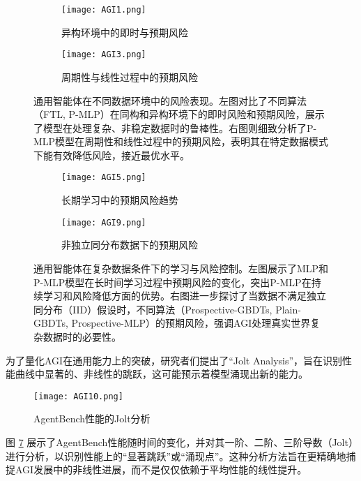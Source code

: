\begin{figure}[H]
    \centering
    \begin{subfigure}[b]{0.49\textwidth}
        \centering
        \texttt{[image: AGI1.png]}
        \caption{异构环境中的即时与预期风险}
        \label{fig:agi_heterogeneous_risk}
    \end{subfigure}
    \hfill
    \begin{subfigure}[b]{0.49\textwidth}
        \centering
        \texttt{[image: AGI3.png]}
        \caption{周期性与线性过程中的预期风险}
        \label{fig:agi_periodic_linear_risk}
    \end{subfigure}
    \caption{通用智能体在不同数据环境中的风险表现。左图对比了不同算法（FTL, P-MLP）在同构和异构环境下的即时风险和预期风险，展示了模型在处理复杂、非稳定数据时的鲁棒性。右图则细致分析了P-MLP模型在周期性和线性过程中的预期风险，表明其在特定数据模式下能有效降低风险，接近最优水平。}
    \label{fig:agi_risk_performance_comparison}
\end{figure}

\begin{figure}[H]
    \centering
    \begin{subfigure}[b]{0.49\textwidth}
        \centering
        \texttt{[image: AGI5.png]}
        \caption{长期学习中的预期风险趋势}
        \label{fig:agi_long_term_risk}
    \end{subfigure}
    \hfill
    \begin{subfigure}[b]{0.49\textwidth}
        \centering
        \texttt{[image: AGI9.png]}
        \caption{非独立同分布数据下的预期风险}
        \label{fig:agi_non_iid_risk}
    \end{subfigure}
    \caption{通用智能体在复杂数据条件下的学习与风险控制。左图展示了MLP和P-MLP模型在长时间学习过程中预期风险的变化，突出P-MLP在持续学习和风险降低方面的优势。右图进一步探讨了当数据不满足独立同分布（IID）假设时，不同算法（Prospective-GBDTs, Plain-GBDTs, Prospective-MLP）的预期风险，强调AGI处理真实世界复杂数据时的必要性。}
    \label{fig:agi_complex_data_learning}
\end{figure}

为了量化AGI在通用能力上的突破，研究者们提出了“Jolt Analysis”，旨在识别性能曲线中显著的、非线性的跳跃，这可能预示着模型涌现出新的能力。

\begin{figure}[H]
    \centering
    \texttt{[image: AGI10.png]}
    \caption{AgentBench性能的Jolt分析}
    \label{fig:agi_jolt_analysis}
\end{figure}
图 \ref{fig:agi_jolt_analysis} 展示了AgentBench性能随时间的变化，并对其一阶、二阶、三阶导数（Jolt）进行分析，以识别性能上的“显著跳跃”或“涌现点”。这种分析方法旨在更精确地捕捉AGI发展中的非线性进展，而不是仅仅依赖于平均性能的线性提升。

